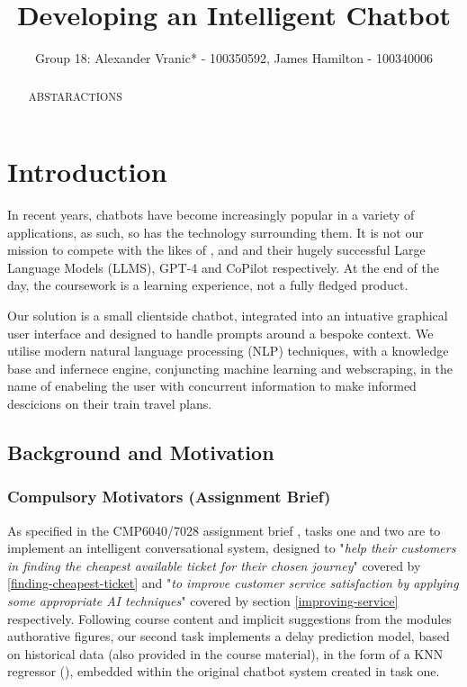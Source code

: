 \documentclass[11pt]{article}
\title{Developing an Intelligent Chatbot}
\author{Group 18: Alexander Vranic* - 100350592, James Hamilton - 100340006}
\begin{document}
\maketitle


\begin{abstract} \label{abstract}
    ABSTARACTIONS

\end{abstract}


\section{Introduction} \label{introduction}

In recent years, chatbots have become increasingly popular in a variety of applications, as such, so has the technology surrounding them. It is not our mission to compete with the likes of \cite{openai}, \cite{microsoft} and \cite{github} and their hugely successful Large Language Models (LLMS), GPT-4 \cite{gpt4} and CoPilot \cite{copilot} respectively. At the end of the day, the coursework is a learning experience, not a fully fledged product.

Our solution is a small clientside chatbot, integrated into an intuative graphical user interface and designed to handle prompts around a bespoke context. We utilise modern natural language processing (NLP) techniques, with a knowledge base and infernece engine, conjuncting machine learning and webscraping, in the name of enabeling the user with concurrent information to make informed descicions on their train travel plans.


\subsection{Background and Motivation} \label{background}

\subsubsection{Compulsory Motivators (Assignment Brief)} \label{compulsory-motivators}

As specified in the CMP6040/7028 assignment brief \cite{AI2018CW}, tasks one and two are to implement an intelligent conversational system, designed to "\textit{help their customers in finding the cheapest available ticket for their chosen journey}" covered by \ref{finding-cheapest-ticket} and "\textit{to improve customer service satisfaction by applying some appropriate AI techniques}" covered by section \ref{improving-service} respectively. Following course content and implicit suggestions from the modules authorative figures, our second task implements a delay prediction model, based on historical data (also provided in the course material), in the form of a KNN regressor (\cite{knn}), embedded within the original chatbot system created in task one.
\end{document}
